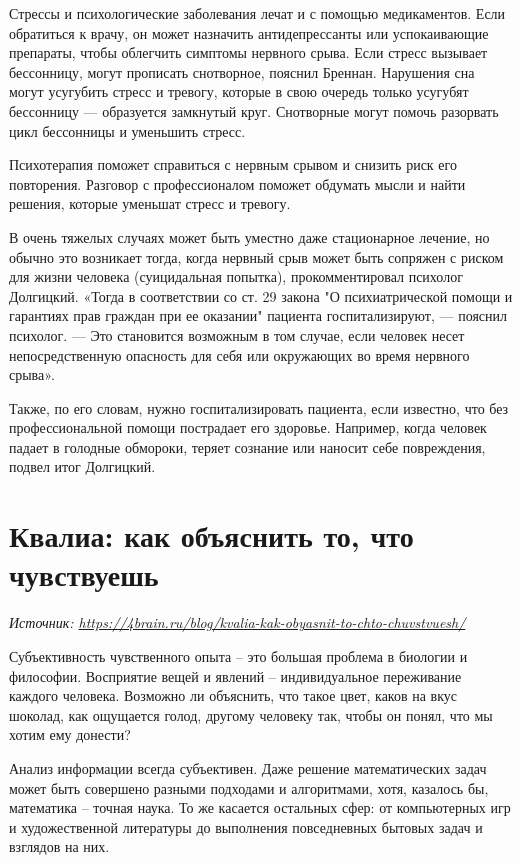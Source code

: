 Стрессы и психологические заболевания лечат и с помощью медикаментов. Если обратиться к врачу, он может назначить антидепрессанты или успокаивающие препараты, чтобы облегчить симптомы нервного срыва. Если стресс вызывает бессонницу, могут прописать снотворное, пояснил Бреннан. Нарушения сна могут усугубить стресс и тревогу, которые в свою очередь только усугубят бессонницу  ---  образуется замкнутый круг. Снотворные могут помочь разорвать цикл бессонницы и уменьшить стресс.

Психотерапия поможет справиться с нервным срывом и снизить риск его повторения. Разговор с профессионалом поможет обдумать мысли и найти решения, которые уменьшат стресс и тревогу.

В очень тяжелых случаях может быть уместно даже стационарное лечение, но обычно это возникает тогда, когда нервный срыв может быть сопряжен с риском для жизни человека (суицидальная попытка), прокомментировал психолог Долгицкий. «Тогда в соответствии со ст. 29 закона "О психиатрической помощи и гарантиях прав граждан при ее оказании" пациента госпитализируют,  ---  пояснил психолог.  ---  Это становится возможным в том случае, если человек несет непосредственную опасность для себя или окружающих во время нервного срыва».

Также, по его словам, нужно госпитализировать пациента, если известно, что без профессиональной помощи пострадает его здоровье. Например, когда человек падает в голодные обмороки, теряет сознание или наносит себе повреждения, подвел итог Долгицкий.

\newpage
\section{Квалиа: как объяснить то, что чувствуешь}

\textit{Источник: \url{https://4brain.ru/blog/kvalia-kak-obyasnit-to-chto-chuvstvuesh/}}

Субъективность чувственного опыта – это большая проблема в биологии и философии. Восприятие вещей и явлений – индивидуальное переживание каждого человека. Возможно ли объяснить, что такое цвет, каков на вкус шоколад, как ощущается голод, другому человеку так, чтобы он понял, что мы хотим ему донести?

Анализ информации всегда субъективен. Даже решение математических задач может быть совершено разными подходами и алгоритмами, хотя, казалось бы, математика – точная наука. То же касается остальных сфер: от компьютерных игр и художественной литературы до выполнения повседневных бытовых задач и взглядов на них.

